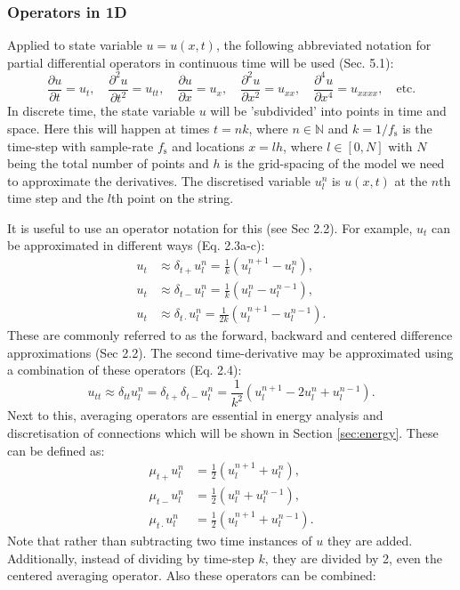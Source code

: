 \documentclass{article}
\begin{document}
\subsubsection{Operators in 1D}\label{subsec:1Doperators}
Applied to state variable $u = u(x,t)$, the following abbreviated notation for partial differential operators in continuous time will be used (Sec. 5.1):
\begin{equation}\label{eq:PDA}
    \frac{\partial u}{\partial t} = u_{t}, \quad \frac{\partial^2 u}{\partial t^2} = u_{tt}, \quad
    \frac{\partial u}{\partial x} = u_{x}, \quad \frac{\partial^2 u}{\partial x^2} = u_{xx}, \quad
    \frac{\partial^4 u}{\partial x^4} = u_{xxxx}, \quad
    \text{etc}.
\end{equation}
In discrete time, the state variable $u$ will be 'subdivided' into points in time and space. Here this will happen at times $t = nk$, where $n \in \mathbb{N}$ and $k = 1 / f_\text{s}$ is the time-step with sample-rate $f_\text{s}$ and locations $x = lh$, where $l \in [0,N]$ with $N$ being the total number of points and $h$ is the grid-spacing of the model we need to approximate the derivatives. The discretised variable $u_l^n$ is $u(x,t)$ at the $n$th time step and the $l$th point on the string.

It is useful to use an operator notation for this (see Sec 2.2). For example, $u_t$ can be approximated in different ways (Eq. 2.3a-c):
\begin{subequations}\label{eq:firstOrderTime}
\begin{align}
    u_t &\approx \delta_{t+}u_l^n = \frac{1}{k} (u_l^{n+1} - u_l^n),\\
    u_t &\approx \delta_{t-}u_l^n = \frac{1}{k} (u_l^n - u_l^{n-1}),\\
    u_t &\approx \delta_{t\cdot}u_l^n = \frac{1}{2k} (u_l^{n+1} - u_l^{n-1}).
\end{align}
\end{subequations}
These are commonly referred to as the forward, backward and centered difference approximations (Sec 2.2). The second time-derivative may be approximated using a combination of these operators (Eq. 2.4):
\begin{equation}\label{eq:secondOrderTime}
u_{tt} \approx \delta_{tt}u_l^n = \delta_{t+}\delta_{t-}u_l^n = \frac{1}{k^2} (u_l^{n+1}-2u_l^n+u_l^{n-1}).
\end{equation}
Next to this, averaging operators are essential in energy analysis and discretisation of connections which will be shown in Section \ref{sec:energy}. These can be defined as:
\begin{align}
    \mu_{t+}u_l^n &= \frac{1}{2} (u_l^{n+1} + u_l^n),\\
    \mu_{t-}u_l^n &= \frac{1}{2} (u_l^n + u_l^{n-1}),\\
   \mu_{t\cdot}u_l^n &= \frac{1}{2} (u_l^{n+1} + u_l^{n-1}).
\end{align}
Note that rather than subtracting two time instances of $u$ they are added. Additionally, instead of dividing by time-step $k$, they are divided by 2, even the centered averaging operator. Also these operators can be combined:
\end{document}
